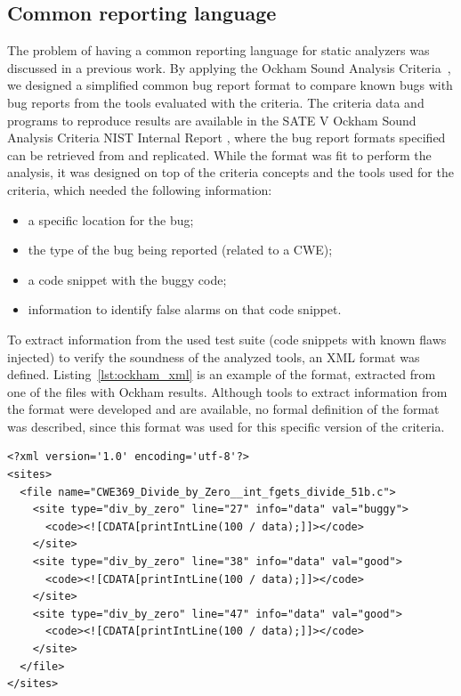 \subsection{Common reporting language}

The problem of having a common reporting language for static analyzers was
discussed in a previous work. By applying the Ockham Sound Analysis
Criteria~\cite{black_sate_2016}, we designed a simplified common bug report
format to compare known bugs with bug reports from the tools evaluated with the
criteria. The criteria data and programs to reproduce results are available in
the SATE V Ockham Sound Analysis Criteria NIST Internal Report
\cite{black_sate_2016}, where the bug report formats specified can be retrieved
from and replicated. While the format was fit to perform the analysis, it was
designed on top of the criteria concepts and the tools used for the criteria,
which needed the following information:

\begin{itemize}
\item a specific location for the bug;
\item the type of the bug being reported (related to a CWE);
\item a code snippet with the buggy code;
\item information to identify false alarms on that code snippet.
\end{itemize}

To extract information from the used test suite (code snippets with known
flaws injected) to verify the soundness of the analyzed tools, an XML
format was defined. Listing~\ref{lst:ockham_xml} is an example of the format,
extracted from one of the files with Ockham results.  Although tools to extract
information from the format were developed and are available, no formal
definition of the format was described, since this format was used for this
specific version of the criteria.

\begin{lstlisting}[caption={Ockham Criteria XML bug report example},label={lst:ockham_xml}]
<?xml version='1.0' encoding='utf-8'?>
<sites>
  <file name="CWE369_Divide_by_Zero__int_fgets_divide_51b.c">
    <site type="div_by_zero" line="27" info="data" val="buggy">
      <code><![CDATA[printIntLine(100 / data);]]></code>
    </site>
    <site type="div_by_zero" line="38" info="data" val="good">
      <code><![CDATA[printIntLine(100 / data);]]></code>
    </site>
    <site type="div_by_zero" line="47" info="data" val="good">
      <code><![CDATA[printIntLine(100 / data);]]></code>
    </site>
  </file>
</sites>
\end{lstlisting}

